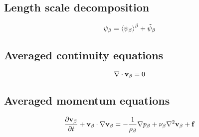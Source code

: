 \subsection{Length scale decomposition}

\begin{equation}
	\psi_{\beta} = {\left< \psi_{\beta} \right>}^{\beta} + \tilde{\psi}_{\beta}
 \end{equation}

\subsection{Averaged continuity equations}


\begin{equation}
\nabla \cdot \textbf{v}_{\beta} = 0
\label{eq:cont}
\end{equation}

\subsection{Averaged momentum equations}


\begin{equation}
\dfrac{\partial \textbf{v}_{\beta}}{\partial t} + \textbf{v}_{\beta} \cdot \nabla \textbf{v}_{\beta} = -\frac{1}{\rho_{\beta}} \nabla p_{\beta} + \nu_{\beta} \nabla^2  \textbf{v}_{\beta}  + \mathbf{f}
\label{eq:mom}
\end{equation}